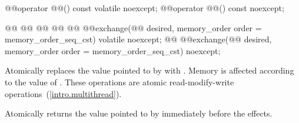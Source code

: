 %
%
%
\begin{itemdecl}
@@operator @@() const volatile noexcept;
@@operator @@() const noexcept;
\end{itemdecl}

\begin{itemdescr}
\pnum
\effects {} 

\end{itemdescr}


%
%
%
%
%
\begin{itemdecl}
@@
@@
@@
@@
@@ @@exchange(@@ desired, memory_order order = memory_order_seq_cst) volatile noexcept;
@@ @@exchange(@@ desired, memory_order order = memory_order_seq_cst) noexcept;
\end{itemdecl}

\begin{itemdescr}
\pnum
\effects Atomically replaces the value pointed to  by 
with .
Memory is affected according to the value of .
These operations are atomic read-modify-write operations~(\ref{intro.multithread}).

\pnum
\returns Atomically returns the value pointed to  by  immediately before the effects.
\end{itemdescr}

